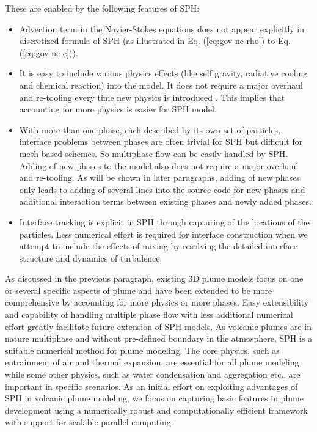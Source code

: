 \documentclass[gmd, manuscript]{copernicus}
\begin{document}
These are enabled by the following features of SPH:
\begin{itemize}
\item Advection term in the Navier-Stokes equations does not appear explicitly in discretized formula of SPH (as illustrated in Eq. (\ref{eq:gov-nc-rho}) to Eq. (\ref{eq:gov-nc-e})).
\item It is easy to include various physics effects (like self gravity, radiative cooling and chemical reaction) into the model. It does not require a major overhaul and re-tooling every time new physics is introduced \citep{monaghan1995sph}. This implies that accounting for more physics is easier for SPH model.
\item With more than one phase, each described by its own set of particles, interface problems between phases are often trivial for SPH but difficult for mesh based schemes. So multiphase flow can be easily handled by SPH. Adding of new phases to the model also does not require a major overhaul and re-tooling. As will be shown in later paragraphs, adding of new phases only leads to adding of several lines into the source code for new phases and additional interaction terms between existing phases and newly added phases.
\item Interface tracking is explicit in SPH through capturing of the locations of the particles. Less numerical effort is required for interface construction when we attempt to include the effects of mixing by resolving the detailed interface structure and dynamics of turbulence.
\end{itemize}

As discussed in the previous paragraph, existing 3D plume models focus on one or several specific aspects of plume and have been extended to be more comprehensive by accounting for more physics or more phases. Easy extensibility and capability of handling multiple phase flow with less additional numerical effort greatly facilitate future extension of SPH models. As volcanic plumes are in nature multiphase and without pre-defined boundary in the atmosphere, SPH is a suitable numerical method for plume modeling. The core physics, such as entrainment of air and thermal expansion, are essential for all plume modeling while some other physics, such as water condensation and aggregation etc., are important in specific scenarios. As an initial effort on exploiting advantages of SPH in volcanic plume modeling, we focus on capturing basic features in plume development using a numerically robust and computationally efficient framework with support for scalable parallel computing. %
\end{document}
